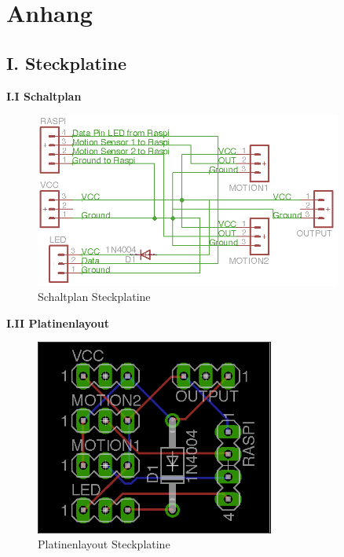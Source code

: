 \appendix   
\section{Anhang}
\subsection*{I. Steckplatine}
\textbf{I.I Schaltplan}\\

\begin{figure}[h]
	\begin{minipage}{0.9\textwidth}
		\centering
		\includegraphics[width=0.9\textwidth]{./data/eagle.png}
		\caption{Schaltplan Steckplatine}
	\end{minipage}
\end{figure}

\textbf{I.II Platinenlayout}\\

\begin{figure}[h]
	\begin{minipage}{0.7\textwidth}
		\centering
		\includegraphics[width=0.7\textwidth]{./data/layout.png}
		\caption{Platinenlayout Steckplatine}
	\end{minipage}
\end{figure}

